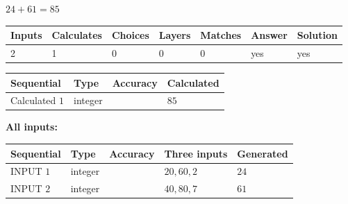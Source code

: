 \documentclass[12pt]{article}
\begin{document}
 

 
 
 
\noindent{}
 
 

$ %
24 +  %
61=   %
85$
 
 
\noindent{}
 
 

 
   
   
   
   
\noindent\begin{tabular}{|l|l|l|l|l|l|l|}
 \hline
Inputs & Calculates & Choices & Layers & Matches & Answer & Solution \\ \hline
 2  & 
 1  & 
 0
  & 
 0  & 
 0  & 
  yes & 
  yes 
  \\ \hline
 \end{tabular}
   
   
   
   
\noindent{}
   
   
  
  
\noindent\begin{tabular}{|l|l|l|l|}
\hline
 Sequential & Type & Accuracy & Calculated \\ 
\hline
 
 
  Calculated $  1 $ & integer &  & 
  $ 85 $ 
 \\  \hline  
 \end{tabular}
   
   
   
   
\noindent\vspace{0.1in}\hspace{-0.08in} {\textbf{\Large{All inputs: }}}
   
   
  
  
\noindent\begin{tabular}{|l|l|l|l|l|}
\hline
 Sequential & Type & Accuracy & Three inputs & Generated \\ 
\hline
 
 
  INPUT $  1 $ & integer &  & $
 20
 , 
 60
 , 
 2
 $ & $ 24 $ 
 \\  \hline  
 
 
  INPUT $  2 $ & integer &  & $
 40
 , 
 80
 , 
 7
 $ & $ 61 $ 
 \\  \hline  
 \end{tabular}
   
\end{document}
